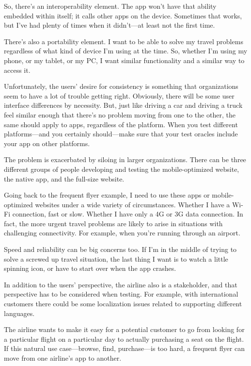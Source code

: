So, there’s an interoperability element. The app won’t have that ability embedded within itself; it calls other apps on the device. Sometimes that works, but I’ve had plenty of times when it didn’t—at least not the first time.

There’s also a portability element. I want to be able to solve my travel problems regardless of what kind of device I’m using at the time. So, whether I’m using my phone, or my tablet, or my PC, I want similar functionality and a similar way to access it.

Unfortunately, the users’ desire for consistency is something that organizations seem to have a lot of trouble getting right. Obviously, there will be some user interface differences by necessity. But, just like driving a car and driving a truck feel similar enough that there’s no problem moving from one to the other, the same should apply to apps, regardless of the platform. When you test different platforms—and you certainly should—make sure that your test oracles include your app on other platforms.

The problem is exacerbated by siloing in larger organizations. There can be three different groups of people developing and testing the mobile-optimized website, the native app, and the full-size website.

Going back to the frequent flyer example, I need to use these apps or mobile-optimized websites under a wide variety of circumstances. Whether I have a Wi-Fi connection, fast or slow. Whether I have only a 4G or 3G data connection. In fact, the more urgent travel problems are likely to arise in situations with challenging connectivity. For example, when you’re running through an airport.

Speed and reliability can be big concerns too. If I’m in the middle of trying to solve a screwed up travel situation, the last thing I want is to watch a little spinning icon, or have to start over when the app crashes.

In addition to the users’ perspective, the airline also is a stakeholder, and that perspective has to be considered when testing. For example, with international customers there could be some localization issues related to supporting different languages.

The airline wants to make it easy for a potential customer to go from looking for a particular flight on a particular day to actually purchasing a seat on the flight. If this natural use case—browse, find, purchase—is too hard, a frequent flyer can move from one airline’s app to another.

